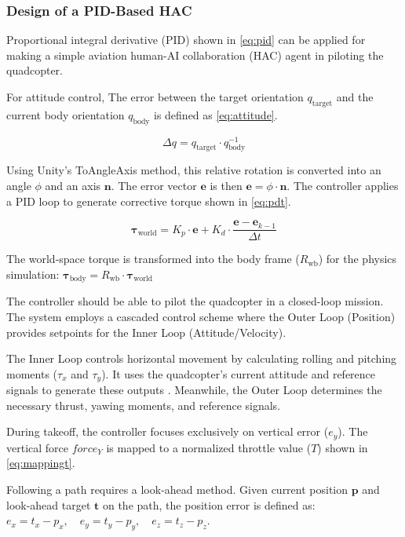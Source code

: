 \subsubsection{Design of a PID-Based HAC}

Proportional integral derivative (PID) shown in \cref{eq:pid} can be applied for making a simple aviation human-AI collaboration (HAC) agent in piloting the quadcopter. 

For attitude control, The error between the target orientation $q_{\text{target}}$ and the current body orientation $q_{\text{body}}$ is defined as \cref{eq:attitude}.

\begin{equation}\label{eq:attitude}
    \Delta q = q_{\text{target}} \cdot q_{\text{body}}^{-1}
\end{equation}

Using Unity's ToAngleAxis method, this relative rotation is converted into an angle $\phi$ and an axis $\mathbf{n}$. The error vector $\mathbf{e}$ is then $\mathbf{e} = \phi \cdot \mathbf{n}$. The controller applies a PID loop to generate corrective torque shown in \cref{eq:pdt}.

\begin{equation}\label{eq:pdt}
    \boldsymbol{\tau}_{\text{world}} = K_p \cdot \mathbf{e} + K_d \cdot \frac{\mathbf{e} - \mathbf{e}_{k-1}}{\Delta t}
\end{equation}

The world-space torque is transformed into the body frame ($R_{\text{wb}}$) for the physics simulation: $\boldsymbol{\tau}_{\text{body}} = R_{\text{wb}} \cdot \boldsymbol{\tau}_{\text{world}}$

The controller should be able to pilot the quadcopter in a closed-loop mission. The system employs a cascaded control scheme where the Outer Loop (Position) provides setpoints for the Inner Loop (Attitude/Velocity).

The Inner Loop controls horizontal movement by calculating rolling and pitching moments ($\tau_x$ and $\tau_y$). It uses the quadcopter's current attitude and reference signals to generate these outputs \parencite{paredes2021quadcopter}. Meanwhile, the Outer Loop determines the necessary thrust, yawing moments, and reference signals.

During takeoff, the controller focuses exclusively on vertical error ($e_y$). The vertical force $force_Y$ is mapped to a normalized throttle value ($T$) shown in \cref{eq:mappingt}.

Following a path requires a look-ahead method. Given current position $\mathbf{p}$ and look-ahead target $\mathbf{t}$ on the path, the position error is defined as: $e_x = t_x - p_x,\quad e_y = t_y - p_y,\quad e_z = t_z - p_z$. 

